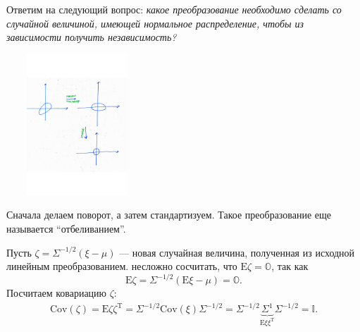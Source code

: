 \documentclass[specialist, 12pt,
subf, %
href, colorlinks=true,
substylefile = spbu.rtx,
]{disser}
\begin{document}
Ответим на следующий вопрос: \textit{какое преобразование необходимо сделать со случайной величиной, имеющей нормальное распределение, чтобы из зависимости получить независимость?}
\begin{center}
	\begin{minipage}{0.8\linewidth}
		\centering
		\includegraphics[width=150pt, height=150pt]{p06}
	\end{minipage}
\end{center}

Сначала делаем поворот, а затем стандартизуем. Такое преобразование еще называется ``отбеливанием''.

Пусть $\zeta = \Sigma^{-1/2} (\xi - \mu)$ --- новая случайная величина, полученная из исходной линейным преобразованием. несложно сосчитать, что $\mathrm{E}\zeta = \mathbb{O}$, так как $$\mathrm{E} \zeta = \Sigma^{-1/2} (\mathrm{E} \xi - \mu) = \mathbb{O}.$$
Посчитаем ковариацию $\zeta$:
\begin{gather*}
\text{Cov} (\zeta) = \mathrm{E} \zeta \zeta^{\mathrm{T}} =\Sigma^{-1/2} \text{Cov} (\xi) \Sigma^{-1/2} = \Sigma^{-1/2} \underbrace{\Sigma^1}_{\mathrm{E}\xi \xi^{\mathrm{T}}} \Sigma^{-1/2} = \mathbb{I}.
\end{gather*}
\end{document}
